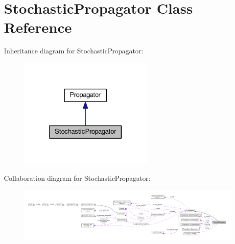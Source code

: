\hypertarget{classStochasticPropagator}{}\section{Stochastic\+Propagator Class Reference}
\label{classStochasticPropagator}


Inheritance diagram for Stochastic\+Propagator\+:
\nopagebreak
\begin{figure}[H]
\begin{center}
\leavevmode
\includegraphics[width=190pt]{classStochasticPropagator__inherit__graph}
\end{center}
\end{figure}


Collaboration diagram for Stochastic\+Propagator\+:
\nopagebreak
\begin{figure}[H]
\begin{center}
\leavevmode
\includegraphics[width=350pt]{classStochasticPropagator__coll__graph}
\end{center}
\end{figure}
